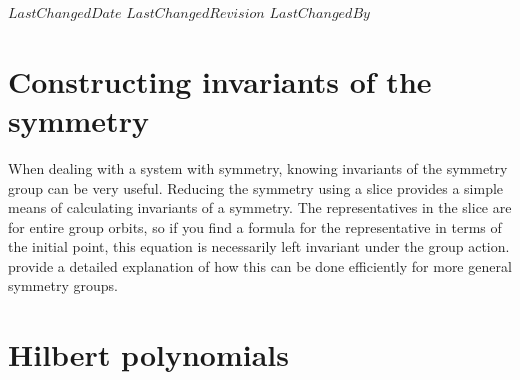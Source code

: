 
{$LastChangedDate$}
{$LastChangedRevision$} {$LastChangedBy$}


\section{Constructing invariants of the symmetry}

When dealing with a system with symmetry, knowing invariants of the
symmetry group can be very useful. Reducing the symmetry
using a slice provides a simple means of calculating invariants of a
symmetry. The representatives in the slice are for entire group orbits,
so if you find a formula for the representative in terms of the initial
point, this equation is necessarily left invariant under the group
action.  provide a detailed explanation
of how this can be done efficiently for more general symmetry groups.


	\ifarticle
	\else

\section{Hilbert polynomials}
\label{SF:relStab}

